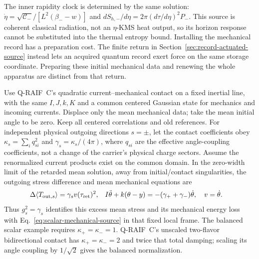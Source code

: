 The inner rapidity clock is determined by the same solution:
$\dot\eta=\sqrt{\mathcal C_-}/[L^2(\beta_--w)]$ and
$dS_{h,-}/d\eta=2\pi(d\tau/d\eta)^2P_-$.
This source is coherent classical radiation, not an $\eta$-KMS heat
output, so its horizon response cannot be substituted into the thermal
entropy bound. Installing the mechanical record has a preparation cost.
The finite return in Section~\ref{sec:record-actuated-source} instead lets
an acquired quantum record exert force on the same storage coordinate.
Preparing these initial mechanical data and renewing the whole apparatus
are distinct from that return.

\begin{proposition}
\label{prop:inertial-mean-bridge}
Use Q-RAIF~C's quadratic current--mechanical contact on a fixed inertial
line, with the same $I,J,k,K$ and a common centered Gaussian state for
mechanics and incoming currents. Displace only the mean mechanical data;
take the mean initial angle to be zero. Keep all centered correlations
and old references. For independent physical outgoing directions
$s=\pm$, let the contact coefficients obey
$\kappa_s=\sum_i q_{si}^2$ and $\gamma_s=\kappa_s/(4\pi)$, where
$q_{si}$ are the effective angle-coupling coefficients, not a change
of the carrier's physical charge sectors.
Assume the renormalized current products exist on the common domain.
In the zero-width limit of the retarded mean solution, away from
initial/contact singularities, the outgoing stress difference and mean
mechanical equations are
\begin{align}
 \Delta\langle T_{{\rm out},s}\rangle
    &=\gamma_s v(\tau_{\rm ret})^2, &
 I\ddot\theta+k(\theta-y)&=-(\gamma_++\gamma_-)\dot\theta,
 \quad v=\dot\theta. \label{eq:mean-contact-bridge}
\end{align}
Thus $g_s^2=\gamma_s$ identifies this excess mean stress and its
mechanical energy loss with Eq.~\eqref{eq:scalar-mechanical-source}
in that fixed local frame. The balanced scalar example requires
$\kappa_+=\kappa_-=1$. Q-RAIF~C's unscaled two-flavor bidirectional
contact has $\kappa_+=\kappa_-=2$ and twice that total damping;
scaling its angle coupling by $1/\sqrt2$ gives the balanced normalization.
\end{proposition}
